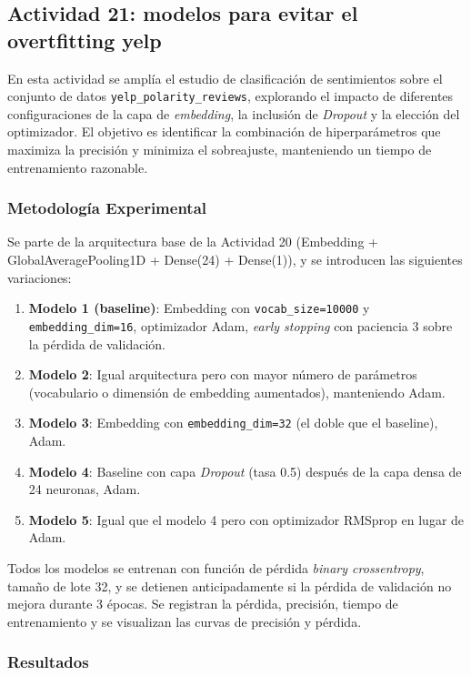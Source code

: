 \documentclass[12pt]{article}
\begin{document}
\subsection{Actividad 21: modelos para evitar el overtfitting yelp}

En esta actividad se amplía el estudio de clasificación de sentimientos sobre el conjunto de datos \texttt{yelp\_polarity\_reviews}, explorando el impacto de diferentes configuraciones de la capa de \textit{embedding}, la inclusión de \textit{Dropout} y la elección del optimizador. El objetivo es identificar la combinación de hiperparámetros que maximiza la precisión y minimiza el sobreajuste, manteniendo un tiempo de entrenamiento razonable.

\subsubsection*{Metodología Experimental}

Se parte de la arquitectura base de la Actividad 20 (Embedding + GlobalAveragePooling1D + Dense(24) + Dense(1)), y se introducen las siguientes variaciones:

\begin{enumerate}
    \item \textbf{Modelo 1 (baseline)}: Embedding con \texttt{vocab\_size=10000} y \texttt{embedding\_dim=16}, optimizador Adam, \textit{early stopping} con paciencia 3 sobre la pérdida de validación.
    \item \textbf{Modelo 2}: Igual arquitectura pero con mayor número de parámetros (vocabulario o dimensión de embedding aumentados), manteniendo Adam.
    \item \textbf{Modelo 3}: Embedding con \texttt{embedding\_dim=32} (el doble que el baseline), Adam.
    \item \textbf{Modelo 4}: Baseline con capa \textit{Dropout} (tasa 0.5) después de la capa densa de 24 neuronas, Adam.
    \item \textbf{Modelo 5}: Igual que el modelo 4 pero con optimizador RMSprop en lugar de Adam.
\end{enumerate}

Todos los modelos se entrenan con función de pérdida \textit{binary crossentropy}, tamaño de lote 32, y se detienen anticipadamente si la pérdida de validación no mejora durante 3 épocas. Se registran la pérdida, precisión, tiempo de entrenamiento y se visualizan las curvas de precisión y pérdida.

\subsubsection*{Resultados}
\end{document}
